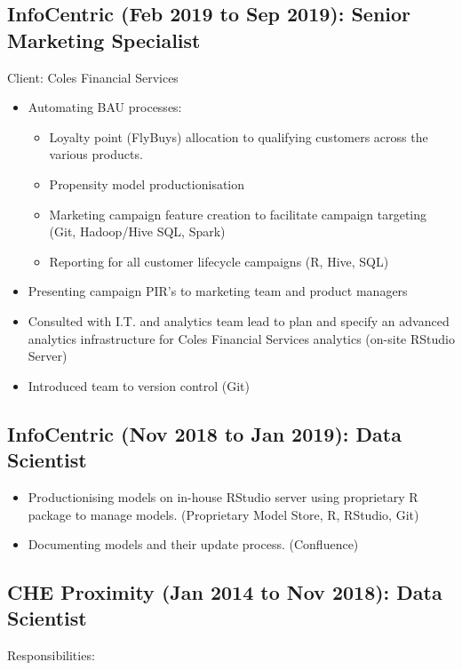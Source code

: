 \documentclass{article}
\begin{document}
\subsection{InfoCentric (Feb 2019 to Sep 2019): Senior Marketing Specialist}

Client: Coles Financial Services

\begin{itemize}
    \item Automating BAU processes:
        \begin{itemize}
            \item Loyalty point (FlyBuys) allocation to qualifying customers across the various products.
            \item Propensity model productionisation 
            \item Marketing campaign feature creation to facilitate campaign targeting (Git, Hadoop/Hive SQL, Spark)
            \item Reporting for all customer lifecycle campaigns (R, Hive, SQL)
        \end{itemize}
    \item Presenting campaign PIR’s to marketing team and product managers
    \item Consulted with I.T. and analytics team lead to plan and specify an advanced analytics infrastructure for Coles Financial Services analytics (on-site RStudio Server)
    \item Introduced team to version control (Git)
\end{itemize}

\subsection{InfoCentric (Nov 2018 to Jan 2019): Data Scientist}
\begin{itemize}
    \item Productionising models on in-house RStudio server using proprietary R package to manage models. (Proprietary Model Store, R, RStudio, Git)
    \item Documenting models and their update process. (Confluence)
\end{itemize}

\subsection{CHE Proximity (Jan 2014 to Nov 2018): Data Scientist}
Responsibilities:
\end{document}
